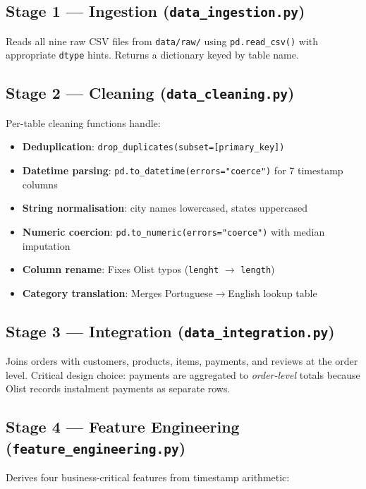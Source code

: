 \documentclass[12pt,a4paper]{report}
\begin{document}
\subsection{Stage 1 — Ingestion (\texttt{data\_ingestion.py})}

Reads all nine raw CSV files from \texttt{data/raw/} using \texttt{pd.read\_csv()} with
appropriate \texttt{dtype} hints. Returns a dictionary keyed by table name.

\subsection{Stage 2 — Cleaning (\texttt{data\_cleaning.py})}

Per-table cleaning functions handle:
\begin{itemize}
  \item \textbf{Deduplication}: \texttt{drop\_duplicates(subset=[primary\_key])}
  \item \textbf{Datetime parsing}: \texttt{pd.to\_datetime(errors="coerce")} for 7 timestamp columns
  \item \textbf{String normalisation}: city names lowercased, states uppercased
  \item \textbf{Numeric coercion}: \texttt{pd.to\_numeric(errors="coerce")} with median imputation
  \item \textbf{Column rename}: Fixes Olist typos (\texttt{lenght} $\to$ \texttt{length})
  \item \textbf{Category translation}: Merges Portuguese$\to$English lookup table
\end{itemize}

\subsection{Stage 3 — Integration (\texttt{data\_integration.py})}

Joins orders with customers, products, items, payments, and reviews at the order level.
Critical design choice: payments are aggregated to \emph{order-level} totals because Olist
records instalment payments as separate rows.

\subsection{Stage 4 — Feature Engineering (\texttt{feature\_engineering.py})}

Derives four business-critical features from timestamp arithmetic:
\end{document}
